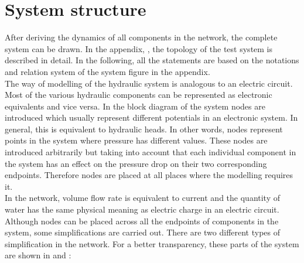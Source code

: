 \section{System structure}  
\label{SystemModel}

After deriving the dynamics of all components in the network, the complete system can be drawn. In the appendix, , the topology of the test system is described in detail. In the following, all the statements are based on the notations and relation system of the system figure in the appendix. 
\\
The way of modelling of the hydraulic system is analogous to an electric circuit. Most of the various hydraulic components can be represented as electronic equivalents and vice versa. In the block diagram of the system nodes are introduced which usually represent different potentials in an electronic system. In general, this is equivalent to hydraulic heads. In other words, nodes represent points in the system where pressure has different values. These nodes are introduced arbitrarily but taking into account that each individual component in the system has an effect on the pressure drop on their two corresponding endpoints. Therefore nodes are placed at all places where the modelling requires it. 
\\
In the network, volume flow rate is equivalent to current and the quantity of water has the same physical meaning as electric charge in an electric circuit. 
\\ 
Although nodes can be placed across all the endpoints of components in the system, some simplifications are carried out. There are two different types of simplification in the network. For a better transparency, these parts of the system are shown in  and : 


